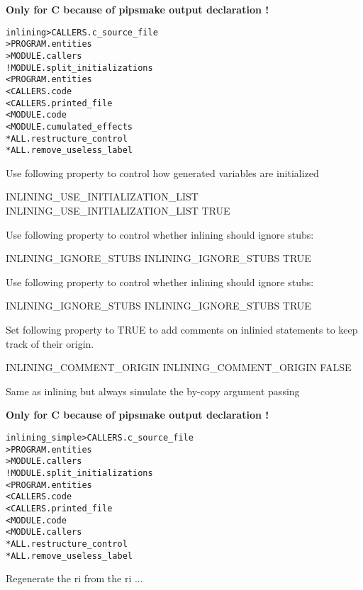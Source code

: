 \documentclass[a4paper]{report}
\newenvironment{PipsMake}{\begin{alltt}}{\end{alltt}}
\newenvironment{PipsPass}[1]{\label{pass:#1}}{}
\begin{document}
\textbf{Only for C because of pipsmake output declaration !}
\begin{PipsMake}
inlining      > CALLERS.c_source_file
              > PROGRAM.entities
              > MODULE.callers
		! MODULE.split_initializations
        < PROGRAM.entities
        < CALLERS.code
        < CALLERS.printed_file
		< MODULE.code
        < MODULE.cumulated_effects
        * ALL.restructure_control
		* ALL.remove_useless_label
\end{PipsMake}

Use following property to control how generated variables are initialized
\begin{PipsProp}{INLINING_USE_INITIALIZATION_LIST}
INLINING_USE_INITIALIZATION_LIST TRUE
\end{PipsProp}

Use following property to control whether inlining should ignore stubs:
\begin{PipsProp}{INLINING_IGNORE_STUBS}
INLINING_IGNORE_STUBS TRUE
\end{PipsProp}

Use following property to control whether inlining should ignore stubs:
\begin{PipsProp}{INLINING_IGNORE_STUBS}
INLINING_IGNORE_STUBS TRUE
\end{PipsProp}

Set following property to TRUE to add comments on inlinied statements to
keep track of their origin.
\begin{PipsProp}{INLINING_COMMENT_ORIGIN}
INLINING_COMMENT_ORIGIN FALSE
\end{PipsProp}

\begin{PipsPass}{inlining_simple}
Same as inlining but always simulate the by-copy argument passing
\end{PipsPass}

\textbf{Only for C because of pipsmake output declaration !}
\begin{PipsMake}
inlining_simple      > CALLERS.c_source_file
                     > PROGRAM.entities
                     > MODULE.callers
		! MODULE.split_initializations
        < PROGRAM.entities
        < CALLERS.code
        < CALLERS.printed_file
		< MODULE.code
        < MODULE.callers
        * ALL.restructure_control
		* ALL.remove_useless_label
\end{PipsMake}

\begin{PipsPass}{recompile_module}
Regenerate the ri from the ri ...
\end{PipsPass}
\end{document}
